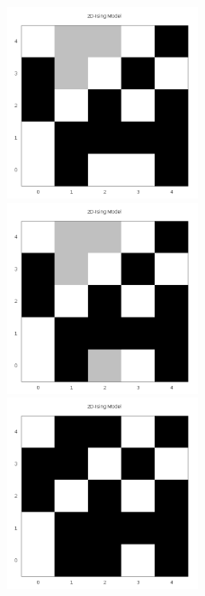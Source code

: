 \begin{figure}[htbp]
\begin{minipage}[b]{6 cm}
    \caption{}
  \end{minipage}
  \begin{minipage}[b]{6 cm}
    \includegraphics[width=0.5\textwidth]{../Graph_Export/cluster_veranschaulichung/Abbildung43b.png} 
    \caption{}
  \end{minipage}
  \begin{minipage}[b]{6 cm}
    \includegraphics[width=0.5\textwidth]{../Graph_Export/cluster_veranschaulichung/Abbildung43c.png} 
    \caption{}
  \end{minipage}
\begin{minipage}[b]{6 cm}
    \includegraphics[width=0.5\textwidth]{../Graph_Export/cluster_veranschaulichung/Abbildung44.png} 
    \caption{}
  \end{minipage}
\end{figure}


